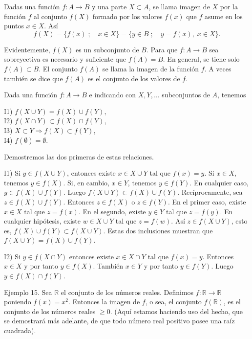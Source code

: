 \documentclass[12pt,oneside]{book}
\begin{document}
Dadas una función \(f: A \to B\) y una parte \(X \subset A\), se llama imagen de \(X\) por la función \(f\) al conjunto \(f(X)\) formado por los valores \(f(x)\) que \(f\) asume en los puntos \(x \in X\). Así
\[
f(X) = \{f(x) \; ; \quad x \in X\} = \{y \in B \; ; \quad y = f(x), \; x \in X\}.
\]

Evidentemente, \(f(X)\) es un subconjunto de \(B\). Para que \(f: A \to B\) sea sobreyectiva es necesario y suficiente que \(f(A) = B\). En general, se tiene solo \(f(A) \subset B\). El conjunto \(f(A)\) se llama la imagen de la función \(f\). A veces también se dice que \(f(A)\) es el conjunto de los valores de \(f\).

Dada una función \(f: A \to B\) e indicando con \(X, Y, \dots\) subconjuntos de \(A\), tenemos

I1) \(f(X \cup Y) = f(X) \cup f(Y)\),  \\
I2) \(f(X \cap Y) \subset f(X) \cap f(Y)\),  \\
I3) \(X \subset Y \Rightarrow f(X) \subset f(Y)\),  \\
I4) \(f(\emptyset) = \emptyset\).

Demostremos las dos primeras de estas relaciones.

I1) Si \(y \in f(X \cup Y)\), entonces existe \(x \in X \cup Y\) tal que \(f(x) = y\). Si \(x \in X\), tenemos \(y \in f(X)\). Si, en cambio, \(x \in Y\), tenemos \(y \in f(Y)\). En cualquier caso, \(y \in f(X) \cup f(Y)\). Luego \(f(X \cup Y) \subset f(X) \cup f(Y)\). Recíprocamente, sea \(z \in f(X) \cup f(Y)\). Entonces \(z \in f(X)\) o \(z \in f(Y)\). En el primer caso, existe \(x \in X\) tal que \(z = f(x)\). En el segundo, existe \(y \in Y\) tal que \(z = f(y)\). En cualquier hipótesis, existe \(w \in X \cup Y\) tal que \(z = f(w)\). Así \(z \in f(X \cup Y)\), esto es, \(f(X) \cup f(Y) \subset f(X \cup Y)\). Estas dos inclusiones muestran que \(f(X \cup Y) = f(X) \cup f(Y)\).

I2) Si \(y \in f(X \cap Y)\) entonces existe \(x \in X \cap Y\) tal que \(f(x) = y\). Entonces \(x \in X\) y por tanto \(y \in f(X)\). También \(x \in Y\) y por tanto \(y \in f(Y)\). Luego \(y \in f(X) \cap f(Y)\).

Ejemplo 15. Sea \(\mathbb{R}\) el conjunto de los números reales. Definimos \(f: \mathbb{R} \to \mathbb{R}\) poniendo \(f(x) = x^2\). Entonces la imagen de \(f\), o sea, el conjunto \(f(\mathbb{R})\), es el conjunto de los números reales \(\geq 0\). (Aquí estamos haciendo uso del hecho, que se demostrará más adelante, de que todo número real positivo posee una raíz cuadrada).
\end{document}
